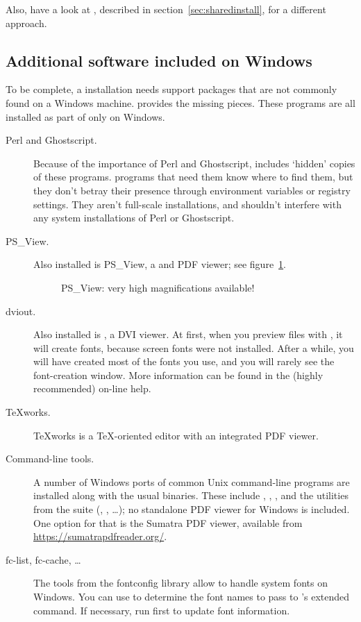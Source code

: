 \documentclass{article}
\begin{document}
Also, have a look at , described in
section~\ref{sec:sharedinstall}, for a different approach.

\subsection{Additional software included on Windows}

To be complete, a \TL{} installation needs support packages that are not
commonly found on a Windows machine. \TL{} provides the missing pieces.
These programs are all installed as part of \TL{} only on Windows.

\begin{description}
\item[Perl and Ghostscript.] Because of the importance of Perl and
  Ghostscript, \TL{} includes `hidden' copies of these
  programs. \TL{} programs that need them know where to find them,
  but they don't betray their presence through environment variables
  or registry settings. They aren't full-scale installations, and
  shouldn't interfere with any system installations of Perl or
  Ghostscript.

\item[PS\_View.] Also installed is PS\_View, a \PS{} and PDF
  viewer; see figure~\ref{fig:psview}.

\begin{figure}[tb]
\centering {}
\caption{PS\_View: very high magnifications available!}\label{fig:psview}
\end{figure}

\item[dviout.] Also installed is , a DVI viewer.
  At first, when you preview files with , it will create
  fonts, because screen fonts were not installed. After a while, you
  will have created most of the fonts you use, and you will rarely see
  the font-creation window.  More information can be found in the
  (highly recommended) on-line help.

\item[\TeX{}works.]  \TeX{}works is a \TeX-oriented editor with
  an integrated PDF viewer.

\item[Command-line tools.] A number of Windows ports of common Unix
  command-line programs are installed along with the usual \TL{}
  binaries. These include , ,
  , and the utilities from the  suite
  (, , \ldots); no standalone PDF
  viewer for Windows is included.  One option for that is the Sumatra
  PDF viewer, available from \url{https://sumatrapdfreader.org/}.

\item[fc-list, fc-cache, \ldots] The tools from the fontconfig library allow
  \XeTeX{} to handle system fonts on Windows.  You can use
   to determine the font names to pass to \XeTeX's
  extended  command. If necessary, run 
  first to update font information.

\end{description}
\end{document}
